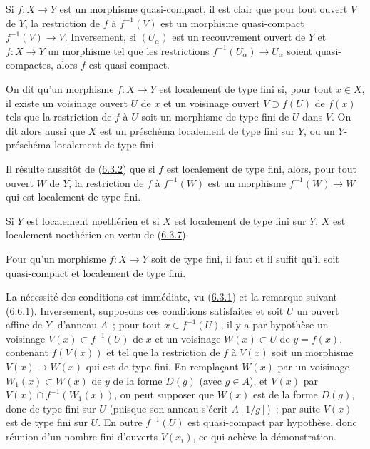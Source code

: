 Si $f:X\to Y$ est un morphisme quasi-compact, il est clair que pour tout
ouvert $V$ de $Y$, la restriction de $f$ à $f^{-1}(V)$ est un morphisme
quasi-compact $f^{-1}(V)\to V$. Inversement, si $(U_\alpha)$ est un
recouvrement ouvert de $Y$ et $f:X\to Y$ un morphisme tel que les restrictions
$f^{-1}(U_\alpha)\to U_\alpha$ soient quasi-compactes, alors $f$ est
quasi-compact.

\begin{definition}[6.6.2]
\label{I.6.6.2-fr}
On dit qu'un morphisme $f:X\to Y$ est localement de type fini si, pour
tout $x\in X$, il existe un voisinage ouvert $U$ de $x$ et un voisinage ouvert
$V\supset f(U)$ de $f(x)$ tels que la
restriction de $f$ à $U$ soit un morphisme de type fini de $U$ dans $V$. On
dit alors aussi que $X$ est un préschéma localement de type fini sur $Y$, ou
un $Y$-préschéma localement de type fini.
\end{definition}

Il résulte aussitôt de (\hyperref[I.6.3.2-fr]{6.3.2}) que si $f$ est
localement de type fini, alors, pour tout ouvert $W$ de $Y$, la restriction
de $f$ à $f^{-1}(W)$ est un morphisme $f^{-1}(W)\to W$ qui est localement de
type fini.

Si $Y$ est localement noethérien et si $X$ est localement de type fini sur
$Y$, $X$ est localement noethérien en vertu de
(\hyperref[I.6.3.7-fr]{6.3.7}).

\begin{proposition}[6.6.3]
\label{I.6.6.3-fr}
Pour qu'un morphisme $f:X\to Y$ soit de type fini, il faut et il suffit qu'il
soit quasi-compact et localement de type fini.
\end{proposition}

La nécessité des conditions est immédiate, vu
(\hyperref[I.6.3.1-fr]{6.3.1}) et la remarque suivant
(\hyperref[I.6.6.1-fr]{6.6.1}). Inversement, supposons ces conditions
satisfaites et soit $U$ un ouvert affine de $Y$, d'anneau $A$~; pour tout
$x\in f^{-1}(U)$, il y a par hypothèse un voisinage
$V(x)\subset f^{-1}(U)$ de $x$ et un voisinage $W(x)\subset U$ de
$y=f(x)$, contenant $f(V(x))$ et tel que la restriction de $f$ à $V(x)$ soit
un morphisme $V(x)\to W(x)$ qui est de type fini. En remplaçant $W(x)$ par
un voisinage $W_1(x)\subset W(x)$ de $y$ de la forme $D(g)$ (avec $g\in A$),
et $V(x)$ par $V(x)\cap f^{-1}(W_1(x))$, on peut supposer que $W(x)$ est de
la forme $D(g)$, donc de type fini sur $U$ (puisque son anneau s'écrit
$A[1/g]$)~; par suite $V(x)$ est de type fini sur $U$. En outre
$f^{-1}(U)$ est quasi-compact par hypothèse, donc réunion d'un nombre fini
d'ouverts $V(x_i)$, ce qui achève la démonstration.

